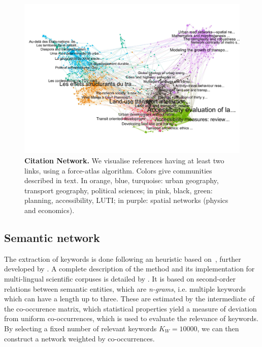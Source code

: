 \documentclass[10pt]{article}
\begin{document}
\begin{figure}[!ht]
\includegraphics[width=\linewidth]{figures/2-2-2-fig-quantepistemo-citnw.jpg}
\caption{\textbf{Citation Network.} We visualise references having at least two links, using a force-atlas algorithm. Colors give communities described in text. In orange, blue, turquoise: urban geography, transport geography, political sciences; in pink, black, green: planning, accessibility, LUTI; in purple: spatial networks (physics and economics).\label{fig:citnw}}
\end{figure}

\subsection{Semantic network}


The extraction of keywords is done following an heuristic based on~\cite{chavalarias2013phylomemetic}, further developed by \cite{bergeaud2017classifying}. A complete description of the method and its implementation for multi-lingual scientific corpuses is detailed by \cite{raimbault2019exploration}. It is based on second-order relations between semantic entities, which are \emph{n-grams}, i.e. multiple keywords which can have a length up to three. These are estimated by the intermediate of the co-occurence matrix, which statistical properties yield a measure of deviation from uniform co-occurrences, which is used to evaluate the relevance of keywords. By selecting a fixed number of relevant keywords $K_W = 10000$, we can then construct a network weighted by co-occurrences.
\end{document}
